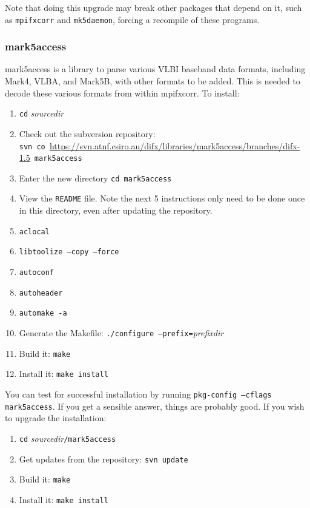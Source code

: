 Note that doing this upgrade may break other packages that depend on it, such as {\tt mpifxcorr} and {\tt mk5daemon}, forcing a recompile of these programs.










\subsubsection{mark5access} \label{sec:m5a}

mark5access is a library to parse various VLBI baseband data formats, including Mark4, VLBA, and Mark5B, with other formats to be added.
This is needed to decode these various formats from within mpifxcorr.
To install:
\begin{enumerate}
\item {\tt cd} {\em sourcedir}
\item Check out the subversion repository: \\
{\tt svn co }\url{https://svn.atnf.csiro.au/difx/libraries/mark5access/branches/difx-1.5}{\tt\ mark5access}
\item Enter the new directory {\tt cd mark5access}
\item View the {\tt README} file.  
Note the next 5 instructions only need to be done once in this directory, even after updating the repository.
\item {\tt aclocal}  
\item {\tt libtoolize --copy --force}
\item {\tt autoconf}
\item {\tt autoheader}
\item {\tt automake -a} 
\item Generate the Makefile: {\tt ./configure --prefix=}{\em prefixdir}
\item Build it: {\tt make}
\item Install it: {\tt make install}
\end{enumerate}

You can test for successful installation by running {\tt pkg-config --cflags mark5access}.  
If you get a sensible answer, things are probably good.
If you wish to upgrade the installation:
\begin{enumerate}
\item {\tt cd} {\em sourcedir}{\tt /mark5access}
\item Get updates from the repository: {\tt svn update}
\item Build it: {\tt make}
\item Install it: {\tt make install}
\end{enumerate}


